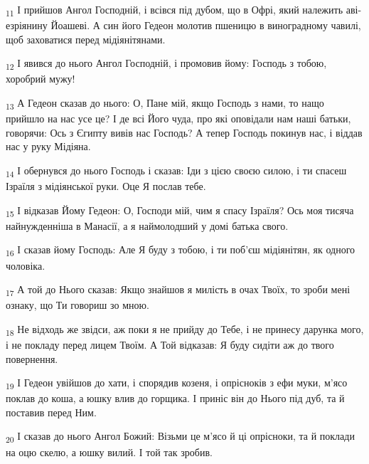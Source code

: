 \begin{tcolorbox}
\textsubscript{11} І прийшов Ангол Господній, і всівся під дубом, що в Офрі, який належить аві-езріянину Йоашеві. А син його Гедеон молотив пшеницю в виноградному чавилі, щоб заховатися перед мідіянітянами.
\end{tcolorbox}
\begin{tcolorbox}
\textsubscript{12} І явився до нього Ангол Господній, і промовив йому: Господь з тобою, хоробрий мужу!
\end{tcolorbox}
\begin{tcolorbox}
\textsubscript{13} А Гедеон сказав до нього: О, Пане мій, якщо Господь з нами, то нащо прийшло на нас усе це? І де всі Його чуда, про які оповідали нам наші батьки, говорячи: Ось з Єгипту вивів нас Господь? А тепер Господь покинув нас, і віддав нас у руку Мідіяна.
\end{tcolorbox}
\begin{tcolorbox}
\textsubscript{14} І обернувся до нього Господь і сказав: Іди з цією своєю силою, і ти спасеш Ізраїля з мідіянської руки. Оце Я послав тебе.
\end{tcolorbox}
\begin{tcolorbox}
\textsubscript{15} І відказав Йому Гедеон: О, Господи мій, чим я спасу Ізраїля? Ось моя тисяча найнужденніша в Манасії, а я наймолодший у домі батька свого.
\end{tcolorbox}
\begin{tcolorbox}
\textsubscript{16} І сказав йому Господь: Але Я буду з тобою, і ти поб'єш мідіянітян, як одного чоловіка.
\end{tcolorbox}
\begin{tcolorbox}
\textsubscript{17} А той до Нього сказав: Якщо знайшов я милість в очах Твоїх, то зроби мені ознаку, що Ти говориш зо мною.
\end{tcolorbox}
\begin{tcolorbox}
\textsubscript{18} Не відходь же звідси, аж поки я не прийду до Тебе, і не принесу дарунка мого, і не покладу перед лицем Твоїм. А Той відказав: Я буду сидіти аж до твого повернення.
\end{tcolorbox}
\begin{tcolorbox}
\textsubscript{19} І Гедеон увійшов до хати, і спорядив козеня, і опрісноків з ефи муки, м'ясо поклав до коша, а юшку влив до горщика. І приніс він до Нього під дуб, та й поставив перед Ним.
\end{tcolorbox}
\begin{tcolorbox}
\textsubscript{20} І сказав до нього Ангол Божий: Візьми це м'ясо й ці опрісноки, та й поклади на оцю скелю, а юшку вилий. І той так зробив.
\end{tcolorbox}
